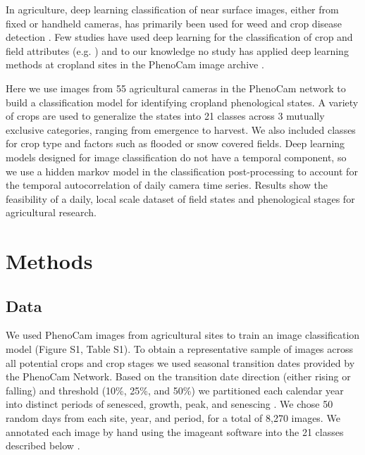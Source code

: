 \documentclass{article}
\begin{document}
In agriculture, deep learning classification of near surface images, either from fixed or handheld cameras, has primarily been used for weed and crop disease detection \citep{benos2021}. Few studies have used deep learning for the classification of crop and field attributes (e.g. \cite{yalcin2017, han-shi2021}) and to our knowledge no study has applied deep learning methods at cropland sites in the PhenoCam image archive \citep{richardson2019}. 

Here we use images from 55 agricultural cameras in the PhenoCam network to build a classification model for identifying cropland phenological states. A variety of crops are used to generalize the states into 21 classes across 3 mutually exclusive categories, ranging from emergence to harvest. We also included classes for crop type and factors such as flooded or snow covered fields. Deep learning models designed for image classification do not have a temporal component, so we use a hidden markov model in the classification post-processing to account for the temporal autocorrelation of daily camera time series. Results show the feasibility of a daily, local scale dataset of field states and phenological stages for agricultural research.


\section{Methods}
\subsection{Data}

We used PhenoCam images from agricultural sites to train an image classification model (Figure S1, Table S1). To obtain a representative sample of images across all potential crops and crop stages we used seasonal transition dates provided by the PhenoCam Network. Based on the transition date direction (either rising or falling) and threshold (10\%, 25\%, and 50\%) we partitioned each calendar year into distinct periods of senesced, growth, peak, and senescing \citep{richardson2018a}. We chose 50 random days from each site, year, and period, for a total of 8,270 images. We annotated each image by hand using the imageant software into the 21 classes described below \citep{barve2019}.
\end{document}
